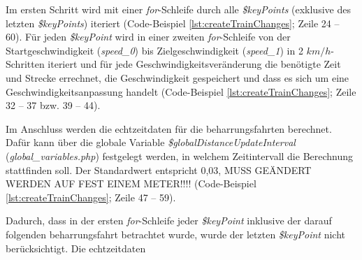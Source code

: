 Im ersten Schritt wird mit einer \textit{for}-Schleife durch alle \textit{\$keyPoints} (exklusive des letzten \textit{\$keyPoints}) iteriert (Code-Beispiel \ref{lst:createTrainChanges}; Zeile 24 -- 60). Für jeden \textit{\$keyPoint} wird in einer zweiten \textit{for}-Schleife von der Startgeschwindigkeit (\textit{speed\_0}) bis Zielgeschwindigkeit (\textit{speed\_1}) in 2 $km/h$-Schritten iteriert und für jede Geschwindigkeitsveränderung die benötigte Zeit und Strecke errechnet, die Geschwindigkeit gespeichert und dass es sich um eine Geschwindigkeitsanpassung handelt (Code-Beispiel \ref{lst:createTrainChanges}; Zeile 32 -- 37 bzw. 39 -- 44). 

Im Anschluss werden die \Gls{echtzeitdaten} für die \Gls{beharrungsfahrt}en berechnet. Dafür kann über die globale Variable \textit{\$globalDistanceUpdateInterval} (\textit{global\_variables.php}) festgelegt werden, in welchem Zeitintervall die Berechnung stattfinden soll. Der Standardwert entspricht 0,03, MUSS GEÄNDERT WERDEN AUF FEST EINEM METER!!!! (Code-Beispiel \ref{lst:createTrainChanges}; Zeile 47 -- 59).

Dadurch, dass in der ersten \textit{for}-Schleife jeder \textit{\$keyPoint} inklusive der darauf folgenden \Gls{beharrungsfahrt} betrachtet wurde, wurde der letzten \textit{\$keyPoint} nicht berücksichtigt. Die \Gls{echtzeitdaten}

 





